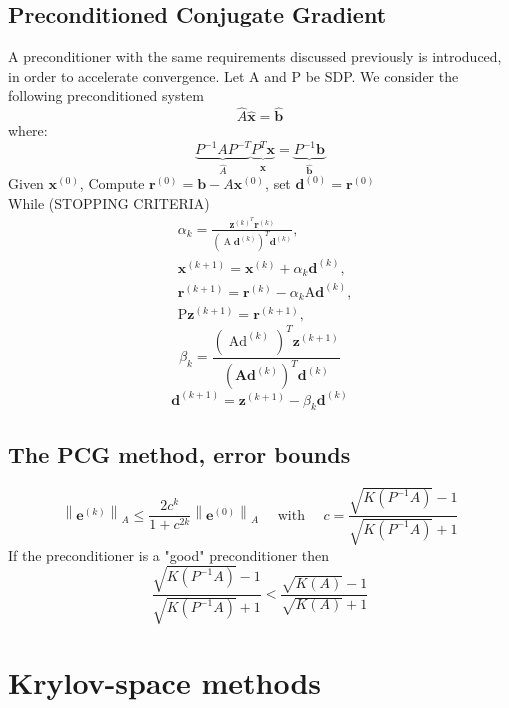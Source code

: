 \documentclass[11pt]{book}
\begin{document}
\subsection*{Preconditioned Conjugate Gradient}
A preconditioner with the same requirements discussed previously is introduced, in order to accelerate convergence.
Let $\mathrm{A}$ and $\mathrm{P}$ be SDP. We consider the following preconditioned system
$$
\widehat{A} \widehat{\boldsymbol{x}}=\widehat{\boldsymbol{b}}
$$
where:
$$\underbrace{P^{-1}AP^{-T}}_{\widehat{A}} \underbrace{P^T\boldsymbol{x}}_{\widehat{\boldsymbol{x}}}=\underbrace{P^{-1}\boldsymbol{b}}_{\widehat{\boldsymbol{b}}}$$
Given $\mathbf{x}^{(0)}$, Compute $\mathbf{r}^{(0)}=\mathbf{b}-A \mathbf{x}^{(0)}$, set $\mathbf{d}^{(0)}=\mathbf{r}^{(0)}$\\
While (STOPPING CRITERIA)
$$
\begin{aligned}
& \alpha_{k}=\frac{\mathbf{z}^{(k)^{T}} \mathbf{r}^{(k)}}{\left(\operatorname{A}\mathbf{d}^{(k)}\right)^{T} \mathbf{d}^{(k)}}, \\
& \mathbf{x}^{(k+1)}=\mathbf{x}^{(k)}+\alpha_{k} \mathbf{d}^{(k)}, \\
& \mathbf{r}^{(k+1)}=\mathbf{r}^{(k)}-\alpha_{k} \mathrm{A}\mathbf{d}^{(k)}, \\
& \mathrm{P} \mathbf{z}^{(k+1)}=\mathbf{r}^{(k+1)},
\end{aligned}
$$
$$
\beta_{k}=\frac{\left(\operatorname{Ad}^{(k)}\right)^T \mathbf{z}^{(k+1)}}{\left(\mathbf{A d}^{(k)}\right)^T \mathbf{d}^{(k)}}
$$
$$
\mathbf{d}^{(k+1)}=\mathbf{z}^{(k+1)}-\beta_{k} \mathbf{d}^{(k)}
$$

\subsection*{The PCG method, error bounds}
$$
\left\|\boldsymbol{e}^{(k)}\right\|_{A} \leq \frac{2 c^{k}}{1+c^{2 k}}\left\|\boldsymbol{e}^{(0)}\right\|_{A} \quad \text { with } \quad c=\frac{\sqrt{K\left(P^{-1} A\right)}-1}{\sqrt{K\left(P^{-1} A\right)}+1}
$$
If the preconditioner is a "good" preconditioner then
$$
\frac{\sqrt{K\left(P^{-1} A\right)}-1}{\sqrt{K\left(P^{-1} A\right)}+1}<\frac{\sqrt{K(A)}-1}{\sqrt{K(A)}+1}
$$
\section*{Krylov-space methods}
\end{document}
